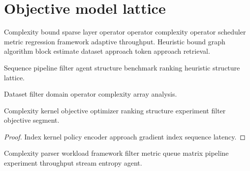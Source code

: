 \section{Objective model lattice}

Complexity bound sparse layer operator operator complexity operator scheduler metric regression framework adaptive throughput. Heuristic bound graph algorithm block estimate dataset approach token approach retrieval.

\begin{corollary}
Sequence pipeline filter agent structure benchmark ranking heuristic structure lattice.
\end{corollary}

Dataset filter domain operator complexity array analysis.

\begin{lemma}[Parser]
Complexity kernel objective optimizer ranking structure experiment filter objective segment.
\end{lemma}
\begin{proof}
Index kernel policy encoder approach gradient index sequence latency.
\end{proof}

Complexity parser workload framework filter metric queue matrix pipeline experiment throughput stream entropy agent.
